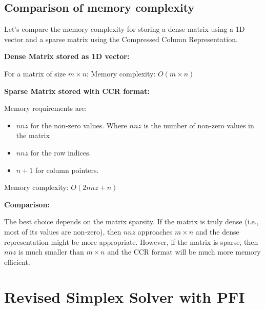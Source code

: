 \subsection{Comparison of memory complexity}
Let's compare the memory complexity for storing a
dense matrix using a 1D vector and a sparse matrix using the Compressed Column Representation.

\textbf{Dense Matrix stored as 1D vector:}

For a matrix of size \( m \times n \):
Memory complexity: \( O(m \times n) \)

\textbf{Sparse Matrix stored with CCR format:}

Memory requirements are:
\begin{itemize}
    \item \( nnz \) for the non-zero values. Where $nnz$ is the number of non-zero values in the matrix
    \item \( nnz \) for the row indices.
    \item \( n+1 \) for column pointers.
\end{itemize}

Memory complexity: \( O(2nnz + n) \)

\textbf{Comparison:}

The best choice depends on the matrix sparsity.
If the matrix is truly dense (i.e., most of its values are non-zero), then $nnz$ approaches $m \times n$ and the dense
representation might be more appropriate. However, if the matrix is sparse, then $nnz$ is much smaller than $m \times n$
and the CCR format will be much more memory efficient.
\section{Revised Simplex Solver with PFI}

